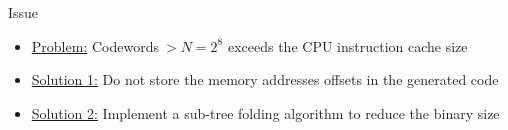 \begin{frame}{Issue}
\begin{figure}[!h]
{
  }
  \end{figure}
  \begin{itemize}
    \item \underline{Problem:} Codewords$~> N = 2^8$ exceeds the CPU instruction cache size
    \pause
    \vspace{0.2cm}
    \item \underline{Solution 1:} Do not store the memory addresses offsets in the generated code
    \pause
    \vspace{0.2cm}
    \item \underline{Solution 2:} Implement a sub-tree folding algorithm to reduce the binary size
  \end{itemize}
\end{frame}

